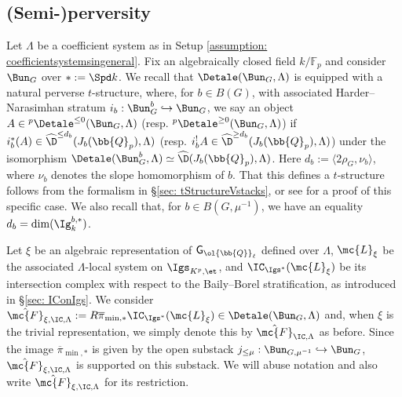 \documentclass[letterpaper,11pt]{amsart}
\begin{document}
\subsection{(Semi-)perversity}\label{sec: perversity} Let $\Lambda$ be a coefficient system as in Setup \ref{assumption: coefficientsystemsingeneral}. Fix an algebraically closed field $k/\mathbb{F}_p$ and consider $\Bun_G$ over $\ast:=\Spd k$. We recall that $\Detale(\Bun_{G},\Lambda)$ is equipped with a natural perverse $t$-structure, where, for $b \in B(G)$, with associated Harder--Narasimhan stratum $i_{b}: \Bun_{G}^{b} \hookrightarrow \Bun_{G}$, we say an object $A \in \phantom{}^{p}\Detale^{\leq 0}(\Bun_{G},\Lambda)$ (resp. $\phantom{}^{p}\Detale^{\geq 0}(\Bun_{G},\Lambda)$) if $i_{b}^{*}(A) \in \widehat{\D}^{\leq d_{b}}(J_{b}(\bb{Q}_{p}),\Lambda)$ (resp. $i_b^!A\in \widehat{\D}^{\geq d_{b}}(J_{b}(\bb{Q}_{p}),\Lambda)$) under the isomorphism $\Detale(\Bun_{G}^{b},\Lambda) \simeq \widehat{\D}(J_{b}(\bb{Q}_{p}),\Lambda)$. Here $d_{b} := \langle 2\rho_{G}, \nu_{b} \rangle$, where $\nu_{b}$ denotes the slope homomorphism of $b$. That this defines a $t$-structure follows from the formalism in \S\ref{sec: tStructureVstacks}, or see \cite[Proposition 8.1.5]{DvHKZ} for a proof of this specific case. We also recall that, for $b \in B(G,\mu^{-1})$, we have an equality $d_{b}= \dim(\Ig_k^{b,*})$. 

Let $\xi$ be an algebraic representation of $\mathsf{G}_{\ol{\bb{Q}}_{\ell}}$ defined over $\Lambda$,
$\mc{L}_\xi$ be the associated $\Lambda$-local system on $\Igs_{K^p,\et}$, and $\IC_{\Igs^\ast}(\mc{L}_\xi)$ be its intersection complex with respect to the Baily--Borel stratification, as introduced in \S\ref{sec: IConIgs}. We consider $\hat{\mc{F}}_{\xi,\IC,\Lambda} := R\overline{\pi}_{\min,\ast}\IC_{\Igs^\ast}(\mc{L}_\xi)\in \Detale(\Bun_G,\Lambda)$ and, when $\xi$ is the trivial representation, we simply denote this by $\hat{\mc{F}}_{\IC,\Lambda}$ as before. Since the image $\overline{\pi}_{\min,\ast}$ is given by the open substack $j_{\leq \mu}: \Bun_{G,\mu^{-1}} \hookrightarrow \Bun_{G}$, $\hat{\mc{F}}_{\xi,\IC,\Lambda}$ is supported on this substack. We will abuse notation and also write $\hat{\mc{F}}_{\xi,\IC,\Lambda}$ for its restriction.
\end{document}
